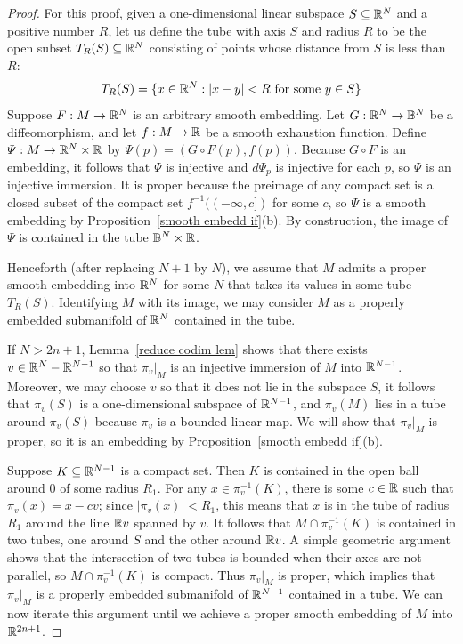 \begin{proof}
For this proof, given a one-dimensional linear subspace $S\subseteq\mathbb{R}^N$ and a positive number $R$, let us define the tube with axis $S$ and radius $R$ to be the open subset $T_R(S)\subseteq\mathbb{R}^N$ consisting of points whose distance from $S$ is less than $R$:
\[T_R(S)=\{x\in\mathbb{R}^N:|x-y|<R\text{ for some $y\in S$}\}\]
Suppose $F:M\to\mathbb{R}^N$ is an arbitrary smooth embedding. Let $G:\mathbb{R}^N\to\mathbb{B}^N$ be a diffeomorphism, and let $f:M\to\mathbb{R}$ be a smooth exhaustion function. Define $\varPsi:M\to\mathbb{R}^N\times\mathbb{R}$ by $\varPsi(p)=(G\circ F(p),f(p))$. Because $G\circ F$ is an embedding, it follows that $\varPsi$ is injective and $d\varPsi_p$ is injective for each $p$, so $\varPsi$ is an injective immersion. It is proper because the preimage of any compact set is a closed subset of the compact set $f^{-1}((-\infty,c])$ for some $c$, so $\varPsi$ is a smooth embedding by Proposition~\ref{smooth embedd if}(b). By construction, the image of $\varPsi$ is contained in
the tube $\mathbb{B}^N\times\mathbb{R}$.\par
Henceforth (after replacing $N+1$ by $N$), we assume that $M$ admits a proper smooth embedding into $\mathbb{R}^N$ for some $N$ that takes its values in some tube $T_R(S)$. Identifying $M$ with its image, we may consider $M$ as a properly embedded submanifold of $\mathbb{R}^N$ contained in the tube.\par
If $N>2n+1$, Lemma~\ref{reduce codim lem} shows that there exists $v\in\mathbb{R}^N-\mathbb{R}^{N-1}$ so that $\pi_v|_M$ is an injective immersion of $M$ into $\mathbb{R}^{N-1}$. Moreover, we may choose $v$ so that it does not lie in the subspace $S$, it follows that $\pi_v(S)$ is a one-dimensional subspace of $\mathbb{R}^{N-1}$, and $\pi_v(M)$ lies in a tube around $\pi_v(S)$ because $\pi_v$ is a bounded linear map. We will show that $\pi_v|_M$ is proper, so it is an embedding by Proposition~\ref{smooth embedd if}(b).\par
Suppose $K\subseteq\mathbb{R}^{N-1}$ is a compact set. Then $K$ is contained in the open ball around $0$ of some radius $R_1$. For any $x\in\pi_v^{-1}(K)$, there is some $c\in\mathbb{R}$ such that $\pi_v(x)=x-cv$; since $|\pi_v(x)|<R_1$, this means that $x$ is in the tube of radius $R_1$ around the line $\mathbb{R} v$ spanned by $v$. It follows that $M\cap\pi^{-1}_v(K)$ is contained in two tubes, one around $S$ and the other around $\mathbb{R} v$. A simple geometric argument shows that the intersection of two tubes is bounded when their axes are not parallel, so $M\cap\pi^{-1}_v(K)$ is compact. Thus $\pi_v|_M$ is proper, which implies that $\pi_v|_M$ is a properly embedded submanifold of $\mathbb{R}^{N-1}$ contained in a tube. We can now iterate this argument until we achieve a proper smooth embedding of $M$ into $\mathbb{R}^{2n+1}$.
\end{proof}
